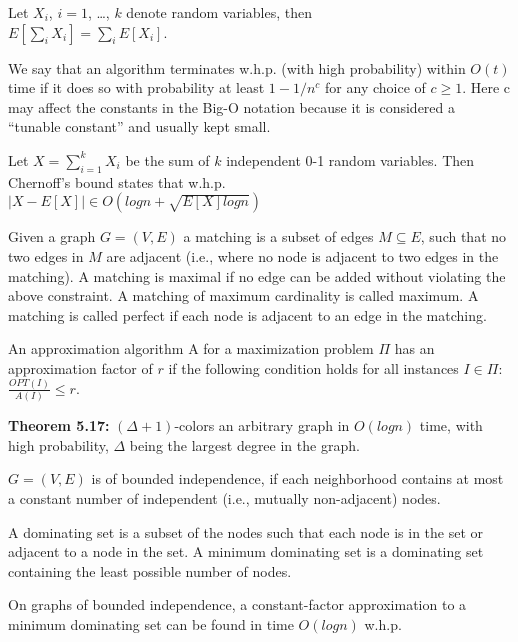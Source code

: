 {
	Let $X_i$, $i = 1$, \ldots , $k$ denote random variables, then\\
	$E[\sum_{i} X_i] = \sum_{i} E[X_i]$.
}

{
	We say that an algorithm terminates w.h.p. (with high probability) within
	$O(t)$ time if it does so with probability at least $1 - 1/n^c$ for any choice
	of $c \geq 1$.
	Here c may affect the constants in the Big-O notation because it is considered
	a ``tunable constant'' and usually kept small.
}

{
	Let $X = \sum_{i=1}^{k} X_i$ be the sum of $k$ independent 0-1 random
	variables. Then Chernoff's bound states that w.h.p.\\
	$|X - E[X]| \in O(log n + \sqrt{E[X] log n})$ 
}

{
	Given a graph $G = (V, E)$ a matching is a subset of edges $M \subseteq E$,
	such that no two edges in $M$ are adjacent (i.e., where no node is adjacent to
	two edges in the matching). A matching is maximal if no edge can be added
	without violating the above constraint. A matching of maximum cardinality is
	called maximum. A matching is called perfect if each node is adjacent to an
	edge in the matching. 
}

{
	An approximation algorithm A for a maximization problem $\Pi$ has an
	approximation factor of $r$ if the following condition holds for all instances $I \in \Pi$:\\
	$\frac{OPT(I)}{A(I)} \leq r$.
}

{
	\begin{items}
		\item {\bf Theorem 5.17:} $(\Delta + 1)$-colors an arbitrary graph in $O(log
		n)$ time, with high probability, $\Delta$ being the largest degree in the
		graph.
	\end{items}
}

{
	$G = (V, E)$ is of bounded independence, if each neighborhood contains at
	most a constant number of independent (i.e., mutually non-adjacent) nodes. 
}

{
	A dominating set is a subset of the nodes such that each node is in the set or
	adjacent to a node in the set. A minimum dominating set is a dominating set
	containing the least possible number of nodes.
}

{
	On graphs of bounded independence, a constant-factor approximation to a
	minimum dominating set can be found in time $O(log n)$ w.h.p.
}









